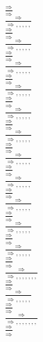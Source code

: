 \documentclass[11pt]{article}
\begin{document}
\begin{center}
\bigskip
\\$\frac{\Rightarrow }{\Rightarrow }$
\bigskip
\\$\frac{\Rightarrow }{\Rightarrow , , , , , }$
\bigskip
\\$\frac{\Rightarrow }{\Rightarrow }$
\bigskip
\\$\frac{\Rightarrow }{\Rightarrow , , , , , }$
\bigskip
\\$\frac{\Rightarrow }{\Rightarrow }$
\bigskip
\\$\frac{\Rightarrow }{\Rightarrow , , , , , }$
\bigskip
\\$\frac{\Rightarrow }{\Rightarrow }$
\bigskip
\\$\frac{\Rightarrow }{\Rightarrow , , , , , }$
\bigskip
\\$\frac{\Rightarrow }{\Rightarrow }$
\bigskip
\\$\frac{\Rightarrow }{\Rightarrow , , , , , }$
\bigskip
\\$\frac{\Rightarrow }{\Rightarrow }$
\bigskip
\\$\frac{\Rightarrow }{\Rightarrow , , , , , }$
\bigskip
\\$\frac{\Rightarrow }{\Rightarrow }$
\bigskip
\\$\frac{\Rightarrow }{\Rightarrow , , , , , }$
\bigskip
\\$\frac{\Rightarrow }{\Rightarrow }$
\bigskip
\\$\frac{\Rightarrow }{\Rightarrow , , , , , }$
\bigskip
\\$\frac{\Rightarrow }{\Rightarrow }$
\bigskip
\\$\frac{\Rightarrow }{\Rightarrow , , , , , }$
\bigskip
\\$\frac{\Rightarrow }{\Rightarrow }$
\bigskip
\\$\frac{\Rightarrow }{\Rightarrow , , , , , }$
\bigskip
\\$\frac{\Rightarrow }{\Rightarrow }$
\bigskip
\\$\frac{\Rightarrow }{\Rightarrow , , , , , }$
\bigskip
\\$\frac{\Rightarrow }{\Rightarrow }$
\bigskip
\\$\frac{\Rightarrow }{\Rightarrow , , , , , , , }$
\bigskip
\\$\frac{\Rightarrow }{\Rightarrow }$
\bigskip
\\$\frac{\Rightarrow }{\Rightarrow , , , , , }$
\bigskip
\\$\frac{\Rightarrow }{\Rightarrow }$
\bigskip
\\$\frac{\Rightarrow }{\Rightarrow , , , , , , , }$
\bigskip
\\$\frac{\Rightarrow }{\Rightarrow }$

\end{center}
\end{document}
